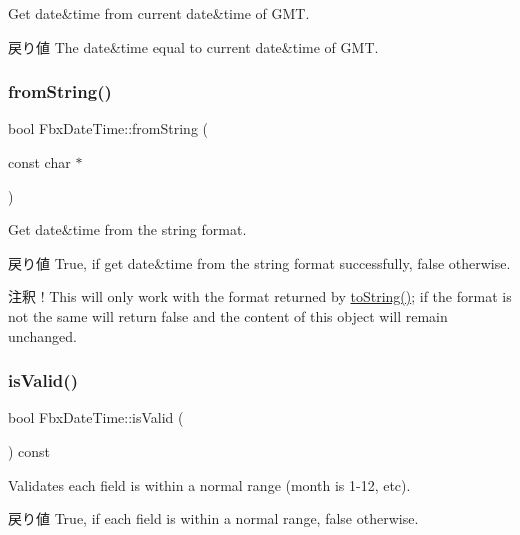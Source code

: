 Get date\&time from current date\&time of G\+MT. \begin{DoxyReturn}{戻り値}
The date\&time equal to current date\&time of G\+MT. 
\end{DoxyReturn}
\mbox{\label{class_fbx_date_time_ad1139b0ea8be739b38956076c5bfd367}} 
\subsubsection{\texorpdfstring{from\+String()}{fromString()}}
{\footnotesize\ttfamily bool Fbx\+Date\+Time\+::from\+String (\begin{DoxyParamCaption}\item[{const char $\ast$}]{ }\end{DoxyParamCaption})}

Get date\&time from the string format. \begin{DoxyReturn}{戻り値}
{\ttfamily True}, if get date\&time from the string format successfully, {\ttfamily false} otherwise. 
\end{DoxyReturn}
\begin{DoxyRemark}{注釈}
! This will only work with the format returned by \hyperlink{class_fbx_date_time_a283a6c2397087698e188e421a4dc665d}{to\+String()}; if the format is not the same will return \textquotesingle{}false\textquotesingle{} and the content of this object will remain unchanged. 
\end{DoxyRemark}
\mbox{\label{class_fbx_date_time_aa48abe1aea0780b94d0db51de1d3fcde}} 
\subsubsection{\texorpdfstring{is\+Valid()}{isValid()}}
{\footnotesize\ttfamily bool Fbx\+Date\+Time\+::is\+Valid (\begin{DoxyParamCaption}{ }\end{DoxyParamCaption}) const}

Validates each field is within a normal range (month is 1-\/12, etc). \begin{DoxyReturn}{戻り値}
{\ttfamily True}, if each field is within a normal range, {\ttfamily false} otherwise. 
\end{DoxyReturn}
\mbox{\label{class_fbx_date_time_a525927fe563bd071b4d4a1a45e1eb251}} 
